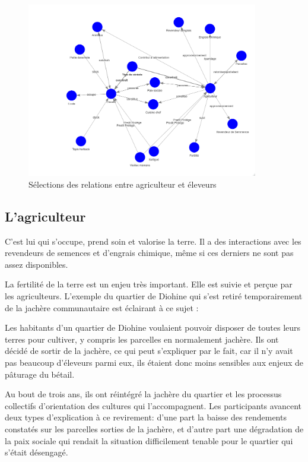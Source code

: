 \begin{figure}
  \begin{center}
    \includegraphics[width=0.9\textwidth]{img/agriculteur_eleveur.png}
  \end{center}
  \caption{Sélections des relations entre agriculteur et éleveurs}
  \label{fig:agripasteur}
\end{figure}

\subsection{L'agriculteur}
C'est lui qui s'occupe, prend soin et valorise la terre. Il a des interactions avec les revendeurs de semences et d'engrais chimique, même si ces derniers ne sont pas assez disponibles.

La fertilité de la terre est un enjeu très important. Elle est suivie et perçue par les agriculteurs. L'exemple du quartier de Diohine qui s'est retiré temporairement de la jachère communautaire est éclairant à ce sujet :

Les habitants d'un quartier de Diohine voulaient pouvoir disposer de toutes leurs terres pour cultiver, y compris les parcelles en normalement jachère. Ils ont décidé de sortir de la jachère, ce qui peut s'expliquer par le fait, car il n'y avait pas beaucoup d'éleveurs parmi eux, ils étaient donc moins sensibles aux enjeux de pâturage du bétail.

Au bout de trois ans, ils ont réintégré la jachère du quartier et les processus collectifs d'orientation des cultures qui l'accompagnent.
Les participants avancent deux types d'explication à ce revirement: d'une part la baisse des rendements constatés sur les parcelles sorties de la jachère, et d'autre part une dégradation de la paix sociale qui rendait la situation difficilement tenable pour le quartier qui s'était désengagé.


